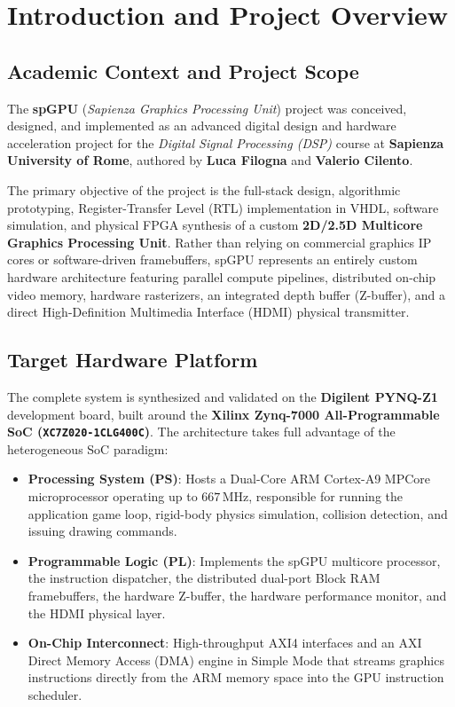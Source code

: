 \chapter{Introduction and Project Overview}
\label{chap:introduction}

\section{Academic Context and Project Scope}
The \textbf{spGPU} (\textit{Sapienza Graphics Processing Unit}) project was conceived, designed, and implemented as an advanced digital design and hardware acceleration project for the \textit{Digital Signal Processing (DSP)} course at \textbf{Sapienza University of Rome}, authored by \textbf{Luca Filogna} and \textbf{Valerio Cilento}.

The primary objective of the project is the full-stack design, algorithmic prototyping, Register-Transfer Level (RTL) implementation in VHDL, software simulation, and physical FPGA synthesis of a custom \textbf{2D/2.5D Multicore Graphics Processing Unit}. Rather than relying on commercial graphics IP cores or software-driven framebuffers, spGPU represents an entirely custom hardware architecture featuring parallel compute pipelines, distributed on-chip video memory, hardware rasterizers, an integrated depth buffer (Z-buffer), and a direct High-Definition Multimedia Interface (HDMI) physical transmitter.

\section{Target Hardware Platform}
The complete system is synthesized and validated on the \textbf{Digilent PYNQ-Z1} development board, built around the \textbf{Xilinx Zynq-7000 All-Programmable SoC (\texttt{XC7Z020-1CLG400C})}. The architecture takes full advantage of the heterogeneous SoC paradigm:
\begin{itemize}
    \item \textbf{Processing System (PS)}: Hosts a Dual-Core ARM Cortex-A9 MPCore microprocessor operating up to $667\,\text{MHz}$, responsible for running the application game loop, rigid-body physics simulation, collision detection, and issuing drawing commands.
    \item \textbf{Programmable Logic (PL)}: Implements the spGPU multicore processor, the instruction dispatcher, the distributed dual-port Block RAM framebuffers, the hardware Z-buffer, the hardware performance monitor, and the HDMI physical layer.
    \item \textbf{On-Chip Interconnect}: High-throughput AXI4 interfaces and an AXI Direct Memory Access (DMA) engine in Simple Mode that streams graphics instructions directly from the ARM memory space into the GPU instruction scheduler.
\end{itemize}

